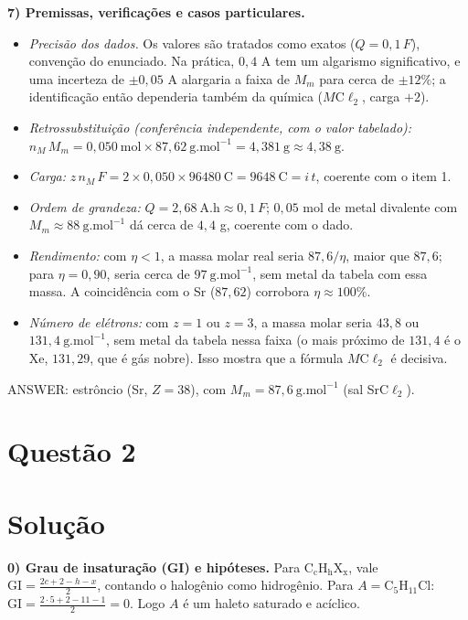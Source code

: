 \documentclass{article}%
\begin{document}
\textbf{7) Premissas, verificações e casos particulares.}
\begin{itemize}
\item \textit{Precisão dos dados.} Os valores são tratados como exatos ($Q = 0{,}1\,F$), convenção do enunciado. Na prática, $0{,}4$ A tem um algarismo significativo, e uma incerteza de $\pm 0{,}05$ A alargaria a faixa de $M_m$ para cerca de $\pm 12\%$; a identificação então dependeria também da química ($M\text{C}\ell_2$, carga $+2$).
\item \textit{Retrossubstituição (conferência independente, com o valor tabelado):} $n_M\,M_m = 0{,}050\ \text{mol} \times 87{,}62\ \text{g.mol}^{-1} = 4{,}381\ \text{g} \approx 4{,}38\ \text{g}$.
\item \textit{Carga:} $z\,n_M\,F = 2 \times 0{,}050 \times 96480\ \text{C} = 9648\ \text{C} = i\,t$, coerente com o item 1.
\item \textit{Ordem de grandeza:} $Q = 2{,}68\ \text{A.h} \approx 0{,}1\,F$; $0{,}05$ mol de metal divalente com $M_m \approx 88\ \text{g.mol}^{-1}$ dá cerca de $4{,}4$ g, coerente com o dado.
\item \textit{Rendimento:} com $\eta < 1$, a massa molar real seria $87{,}6/\eta$, maior que $87{,}6$; para $\eta = 0{,}90$, seria cerca de $97\ \text{g.mol}^{-1}$, sem metal da tabela com essa massa. A coincidência com o Sr ($87{,}62$) corrobora $\eta \approx 100\%$.
\item \textit{Número de elétrons:} com $z = 1$ ou $z = 3$, a massa molar seria $43{,}8$ ou $131{,}4\ \text{g.mol}^{-1}$, sem metal da tabela nessa faixa (o mais próximo de $131{,}4$ é o Xe, $131{,}29$, que é gás nobre). Isso mostra que a fórmula $M\text{C}\ell_2$ é decisiva.
\end{itemize}

ANSWER: estrôncio (Sr, $Z = 38$), com $M_m = 87{,}6\ \text{g.mol}^{-1}$ (sal SrC$\ell_2$).%
\newpage%
\section*{Questão 2}

\section*{Solução}

\textbf{0) Grau de insaturação (GI) e hipóteses.} Para $\mathrm{C_cH_hX_x}$, vale $\mathrm{GI}=\frac{2c+2-h-x}{2}$, contando o halogênio como hidrogênio. Para $A=\mathrm{C_5H_{11}Cl}$: $\mathrm{GI}=\frac{2\cdot 5+2-11-1}{2}=0$. Logo $A$ é um haleto saturado e acíclico.
\end{document}
